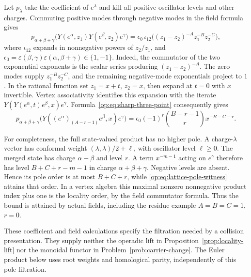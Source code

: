 Let \(p_\lambda\) take the coefficient of \(e^\lambda\) and
kill all positive oscillator levels and other charges.  Commuting
positive modes through negative modes in the field formula gives
\[
 p_{\alpha+\beta+\gamma}
\bigl(Y(e^\alpha,z_1)Y(e^\beta,z_2)e^\gamma\bigr)
 =\epsilon_0\,\iota_{12}
 \bigl((z_1-z_2)^{-A}z_1^{-B}z_2^{-C}\bigr),
\]
where \(\iota_{12}\) expands in nonnegative powers of \(z_2/z_1\),
and \(\epsilon_0=\varepsilon(\beta,\gamma)
\varepsilon(\alpha,\beta+\gamma)\in\{1,-1\}\).
Indeed, the commutator of the two exponential exponents is
the scalar series producing \((z_1-z_2)^{-A}\).
The zero modes supply \(z_1^{-B}z_2^{-C}\), and the remaining
negative-mode exponentials project to \(1\).
In the rational function set \(z_1=x+t\), \(z_2=x\), then
expand at \(t=0\) with \(x\) invertible.
Vertex associativity identifies this expansion with the iterate
\(Y(Y(e^\alpha,t)e^\beta,x)e^\gamma\).
Formula~\eqref{op:eq:sharp-three-point} consequently gives
\begin{equation}\label{op:eq:lattice-pole-witness}
 p_{\alpha+\beta+\gamma}
 \bigl(Y((e^\alpha)_{(A-r-1)}e^\beta,x)e^\gamma\bigr)
 =\epsilon_0(-1)^r\binom{B+r-1}{r}x^{-B-C-r}.
\end{equation}

For completeness, the full state-valued product has no higher pole.
A charge-\(\lambda\) vector has conformal weight
\((\lambda,\lambda)/2+\ell\), with oscillator level \(\ell\ge0\).
The merged state has charge \(\alpha+\beta\) and level \(r\).
A term \(x^{-m-1}\) acting on \(e^\gamma\) therefore has level
\(B+C+r-m-1\) in charge \(\alpha+\beta+\gamma\).
Negative levels are absent.  Hence its pole order is at most
\(B+C+r\), while \eqref{op:eq:lattice-pole-witness} attains that
order.  In a vertex algebra this maximal nonzero nonnegative product
index plus one is the locality order, by the field commutator formula.
Thus the bound is attained by actual fields, including the residue
example \(A=B=C=1\), \(r=0\).

These coefficient and field calculations specify the filtration
needed by a collision presentation.  They supply neither the operadic
lift in Proposition~\ref{prop:locality-lift} nor the monoidal functor
in Problem~\ref{prob:carrier-change}.  The Euler product below uses
root weights and homological parity, independently of this pole
filtration.
